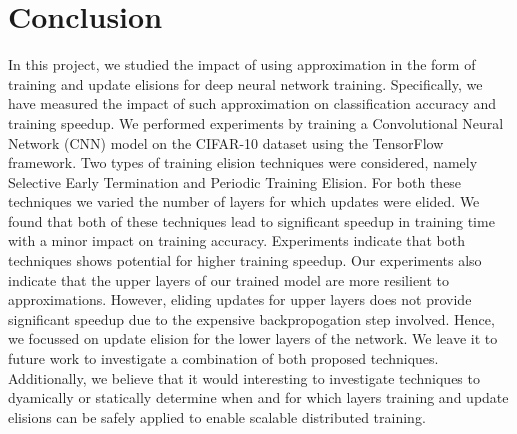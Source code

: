 \section{Conclusion}
In this project, we studied the impact of using approximation in the form of training and update elisions for deep neural network training. Specifically, we have measured the impact of such approximation on classification accuracy and training speedup. We performed experiments by training a Convolutional Neural Network (CNN) model on the CIFAR-10 dataset using the TensorFlow framework. Two types of training elision techniques were considered, namely Selective Early Termination and Periodic Training Elision. For both these techniques we varied the number of layers for which updates were elided. We found that both of these techniques lead to significant speedup in training time with a minor impact on training accuracy. Experiments indicate that both techniques shows potential for higher training speedup. Our experiments also indicate that the upper layers of our trained model are more resilient to approximations. However, eliding updates for upper layers does not provide significant speedup due to the expensive backpropogation step involved. Hence, we focussed on update elision for the lower layers of the network.
We leave it to future work to investigate a combination of both proposed techniques. Additionally, we believe that it would interesting to investigate techniques to dyamically or statically determine when and for which layers training and update elisions can be safely applied to enable scalable distributed training.  
